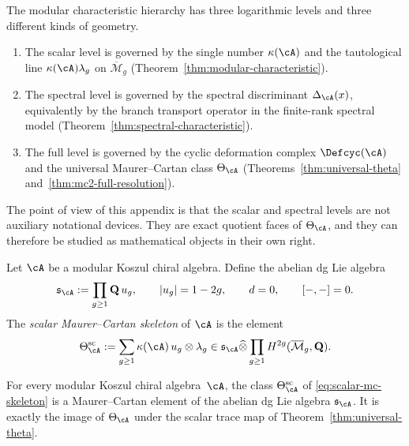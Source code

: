 The modular characteristic hierarchy has three logarithmic levels and
three different kinds of geometry.
\begin{enumerate}[label=\textup{(\roman*)}]
\item The scalar level is governed by the single number
 \(\kappa(\cA)\) and the tautological line
 \(\kappa(\cA)\lambda_g\) on \(\overline{\mathcal M}_g\)
 (Theorem~\ref{thm:modular-characteristic}).
\item The spectral level is governed by the spectral discriminant
 \(\Delta_{\cA}(x)\), equivalently by the branch transport operator in
 the finite-rank spectral model
 (Theorem~\ref{thm:spectral-characteristic}).
\item The full level is governed by the cyclic deformation complex
 \(\Defcyc(\cA)\) and the universal Maurer--Cartan class
 \(\Theta_{\cA}\)
 (Theorems~\ref{thm:universal-theta}
 and~\ref{thm:mc2-full-resolution}).
\end{enumerate}
The point of view of this appendix is that the scalar and spectral levels
are not auxiliary notational devices. They are exact quotient faces of
\(\Theta_{\cA}\), and they can therefore be studied as mathematical
objects in their own right.

\begin{definition}
\label{def:scalar-mc-skeleton}
Let \(\cA\) be a modular Koszul chiral algebra. Define the abelian dg
Lie algebra
\[
\mathfrak{s}_{\cA}:=\prod_{g\geq 1}\mathbf Q\,u_g,
\qquad
|u_g|=1-2g,
\qquad
d=0,
\qquad
[-,-]=0.
\]
The \emph{scalar Maurer--Cartan skeleton} of \(\cA\) is the element
\begin{equation}
\label{eq:scalar-mc-skeleton}
\Theta^{\mathrm{sc}}_{\cA}
:=
\sum_{g\geq 1}
\kappa(\cA)
\,u_g\otimes \lambda_g
\in
\mathfrak{s}_{\cA}
\widehat\otimes
\prod_{g\geq 1}H^{2g}(\overline{\mathcal M}_g,\mathbf Q).
\end{equation}
\end{definition}

\begin{proposition}
\label{prop:scalar-mc-skeleton}
For every modular Koszul chiral algebra~\(\cA\), the class
\(\Theta^{\mathrm{sc}}_{\cA}\) of
\eqref{eq:scalar-mc-skeleton} is a Maurer--Cartan element of the
abelian dg Lie algebra \(\mathfrak{s}_{\cA}\). It is exactly
 the image of \(\Theta_{\cA}\) under the scalar trace map of
Theorem~\ref{thm:universal-theta}.
\end{proposition}

